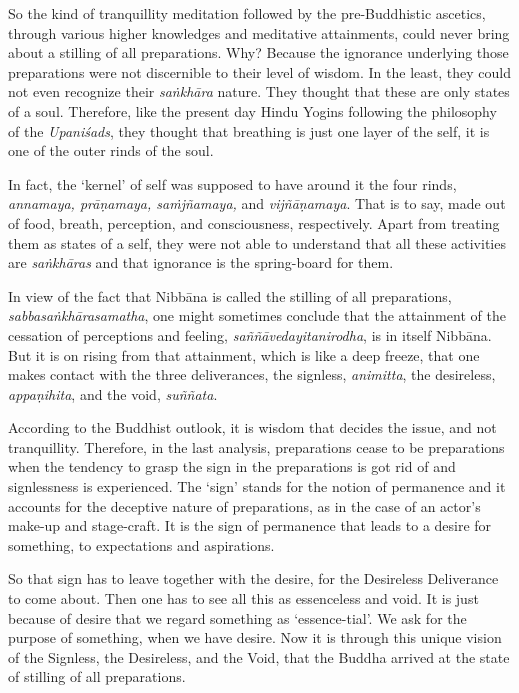 So the kind of tranquillity meditation followed by the pre-Buddhistic ascetics, through various higher knowledges and meditative attainments, could never bring about a stilling of all preparations. Why? Because the ignorance underlying those preparations were not discernible to their level of wisdom. In the least, they could not even recognize their \emph{saṅkhāra} nature. They thought that these are only states of a soul. Therefore, like the present day Hindu Yogins following the philosophy of the \emph{Upaniśads}, they thought that breathing is just one layer of the self, it is one of the outer rinds of the soul.

\clearpage

In fact, the `kernel' of self was supposed to have around it the four rinds, \emph{annamaya, prāṇamaya, saṁjñamaya,} and \emph{vijñāṇamaya}. That is to say, made out of food, breath, perception, and consciousness, respectively. Apart from treating them as states of a self, they were not able to understand that all these activities are \emph{saṅkhāras} and that ignorance is the spring-board for them.

In view of the fact that Nibbāna is called the stilling of all preparations, \emph{sabbasaṅkhārasamatha}, one might sometimes conclude that the attainment of the cessation of perceptions and feeling, \emph{saññāvedayitanirodha}, is in itself Nibbāna. But it is on rising from that attainment, which is like a deep freeze, that one makes contact with the three deliverances, the signless, \emph{animitta}, the desireless, \emph{appaṇihita}, and the void, \emph{suññata}.

According to the Buddhist outlook, it is wisdom that decides the issue, and not tranquillity. Therefore, in the last analysis, preparations cease to be preparations when the tendency to grasp the sign in the preparations is got rid of and signlessness is experienced. The `sign' stands for the notion of permanence and it accounts for the deceptive nature of preparations, as in the case of an actor's make-up and stage-craft. It is the sign of permanence that leads to a desire for something, to expectations and aspirations.

So that sign has to leave together with the desire, for the Desireless Deliverance to come about. Then one has to see all this as essenceless and void. It is just because of desire that we regard something as `essence-tial'. We ask for the purpose of something, when we have desire. Now it is through this unique vision of the Signless, the Desireless, and the Void, that the Buddha arrived at the state of stilling of all preparations.


